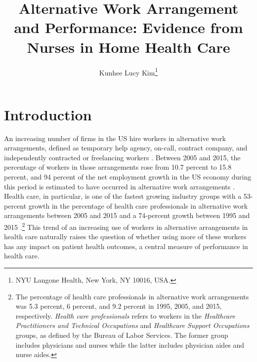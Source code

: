 \documentclass[final,12pt]{article}
\title{Alternative Work Arrangement and Performance: Evidence from Nurses in Home Health Care}
\author{Kunhee Lucy Kim\thanks{NYU Langone Health, New York, NY 10016, USA.}}
\date{\parbox{\linewidth}{\centering%
	January 2018 \hspace*{0cm} \endgraf\medskip
	}}
\begin{document}
\begin{singlespace}
\maketitle


\end{singlespace}


\section{Introduction}

An increasing number of firms in the US hire workers in alternative work arrangements, defined as temporary help agency, on-call, contract company, and independently contracted or freelancing workers \citep{Katz2016}. Between 2005 and 2015, the percentage of workers in those arrangements rose from 10.7 percent to 15.8 percent, and 94 percent of the net employment growth in the US economy during this period is estimated to have occurred in alternative work arrangements \citep{Katz2016}. Health care, in particular, is one of the fastest growing industry groups with a 53-percent growth in the percentage of health care professionals in alternative work arrangements between 2005 and 2015 and a 74-percent growth between 1995 and 2015 \citep{Katz2016}.\footnote{The percentage of health care professionals in alternative work arrangements was 5.3 percent, 6 percent, and 9.2 percent in 1995, 2005, and 2015, respectively. \textit{Health care professionals} refers to workers in the \textit{Healthcare Practitioners and Technical Occupations} and \textit{Healthcare Support Occupations} groups, as defined by the Bureau of Labor Services. The former group includes physicians and nurses while the latter includes physician aides and nurse aides.}
This trend of an increasing use of workers in alternative arrangements in health care naturally raises the question of whether using more of these workers has any impact on patient health outcomes, a central measure of performance in health care.
\end{document}
